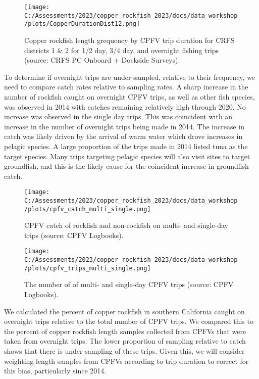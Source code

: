 \documentclass[
]{article}
\begin{document}
\begin{figure}
\centering
\texttt{[image: C:/Assessments/2023/copper\_rockfish\_2023/docs/data\_workshop/plots/CopperDurationDist12.png]}
\caption{Copper rockfish length grequency by CPFV trip duration for CRFS
districts 1 \& 2 for 1/2 day, 3/4 day, and overnight fishing trips
(source: CRFS PC Onboard + Dockside
Surveys).\label{fig:cpfv-length-duration}}
\end{figure}

To determine if overnight trips are under-sampled, relative to their
frequency, we need to compare catch rates relative to sampling rates. A
sharp increase in the number of rockfish caught on overnight CPFV trips,
as well as other fish species, was observed in 2014 with catches
remaining relatively high through 2020. No increase was observed in the
single day trips. This was coincident with an increase in the number of
overnight trips being made in 2014. The increase in catch was likely
driven by the arrival of warm water which drove increases in pelagic
species. A large proportion of the trips made in 2014 listed tuna as the
target species. Many trips targeting pelagic species will also visit
sites to target groundfish, and this is the likely cause for the
coincident increase in groundfish catch.

\begin{figure}
\centering
\texttt{[image: C:/Assessments/2023/copper\_rockfish\_2023/docs/data\_workshop/plots/cpfv\_catch\_multi\_single.png]}
\caption{CPFV catch of rockfish and non-rockfish on multi- and
single-day trips (source: CPFV
Logbooks).\label{fig:cpfv-catch-duration}}
\end{figure}

\begin{figure}
\centering
\texttt{[image: C:/Assessments/2023/copper\_rockfish\_2023/docs/data\_workshop/plots/cpfv\_trips\_multi\_single.png]}
\caption{The number of of multi- and single-day CPFV trips (source: CPFV
Logbooks).\label{fig:cpfv-trips-duration}}
\end{figure}

We calculated the percent of copper rockfish in southern California
caught on overnight trips relative to the total number of CPFV trips. We
compared this to the percent of copper rockfish length samples collected
from CPFVs that were taken from overnight trips. The lower proportion of
sampling relative to catch shows that there is under-sampling of these
trips. Given this, we will consider weighting length samples from CPFVs
according to trip duration to correct for this bias, particularly since
2014.
\end{document}
